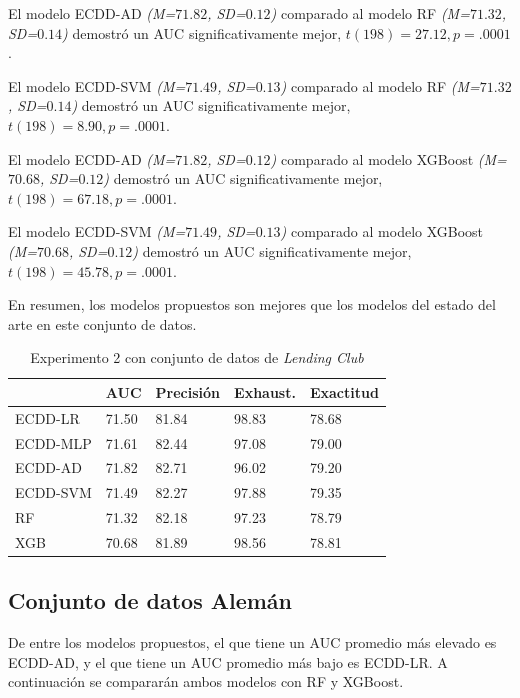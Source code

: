 El modelo ECDD-AD \textit{(M=$71.82$, SD=$0.12$)} comparado al modelo \ac{RF} \textit{(M=$71.32$, SD=$0.14$)} demostró un \ac{AUC} significativamente mejor, $t(198)=27.12, p=.0001$.

El modelo ECDD-SVM  \textit{(M=$71.49$, SD=$0.13$)} comparado al modelo \ac{RF} \textit{(M=$71.32$, SD=$0.14$)} demostró un \ac{AUC} significativamente mejor, $t(198)=8.90, p=.0001$.

El modelo ECDD-AD \textit{(M=$71.82$, SD=$0.12$)} comparado al modelo \ac{XGBoost} \textit{(M=$70.68$, SD=$0.12$)} demostró un \ac{AUC} significativamente mejor, $t(198)=67.18, p=.0001$.

El modelo ECDD-SVM \textit{(M=$71.49$, SD=$0.13$)} comparado al modelo \ac{XGBoost} \textit{(M=$70.68$, SD=$0.12$)} demostró un \ac{AUC} significativamente mejor, $t(198)=45.78, p=.0001$.

En resumen, los modelos propuestos son mejores que los modelos del estado del arte en este conjunto de datos.

\begin{table}[htbp]
\centering
\caption{Experimento 2 con conjunto de datos de \textit{Lending Club}}
\label{tab:lc-proc2}
\begin{tabularx}{0.75\textwidth}{|l|Y Y Y Y|}
				\hline
				& AUC		& Precisión	& Exhaust.		& Exactitud	\\
				\hline
ECDD-LR			& 71.50		& 81.84		& 98.83			& 78.68		\\		%
ECDD-MLP		& 71.61		& 82.44		& 97.08			& 79.00		\\		%
ECDD-AD			& 71.82		& 82.71		& 96.02			& 79.20		\\		%
ECDD-SVM		& 71.49		& 82.27		& 97.88			& 79.35		\\		%
				\hline
RF				& 71.32		& 82.18		& 97.23			& 78.79		\\		%
XGB				& 70.68		& 81.89		& 98.56			& 78.81		\\		%
				\hline
\end{tabularx}
\end{table}

\subsection{Conjunto de datos Alemán}

De entre los modelos propuestos, el que tiene un \ac{AUC} promedio más elevado es ECDD-AD, y el que tiene un \ac{AUC} promedio más bajo es ECDD-LR. A continuación se compararán ambos modelos con \ac{RF} y \ac{XGBoost}.

